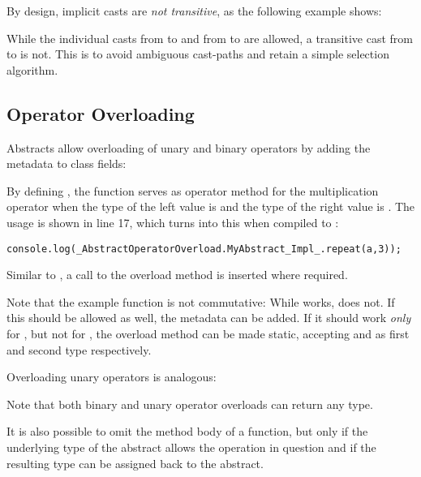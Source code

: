

By design, implicit casts are \emph{not transitive}, as the following example shows:

While the individual casts from  to  and from  to  are allowed, a transitive cast from  to  is not. This is to avoid ambiguous cast-paths and retain a simple selection algorithm. 




\subsection{Operator Overloading}
\label{types-abstract-operator-overloading}

Abstracts allow overloading of unary and binary operators by adding the  metadata to class fields:

By defining , the function  serves as operator method for the multiplication \expr{*} operator when the type of the left value is  and the type of the right value is . The usage is shown in line 17, which turns into this when compiled to :

\begin{lstlisting}
console.log(_AbstractOperatorOverload.MyAbstract_Impl_.repeat(a,3));
\end{lstlisting}
Similar to , a call to the overload method is inserted where required.

Note that the example  function is not commutative: While  works,  does not. If this should be allowed as well, the  metadata can be added. If it should work \emph{only} for , but not for , the overload method can be made static, accepting  and  as first and second type respectively.

Overloading unary operators is analogous:

Note that both binary and unary operator overloads can return any type.

It is also possible to omit the method body of a  function, but only if the underlying type of the abstract allows the operation in question and if the resulting type can be assigned back to the abstract.


